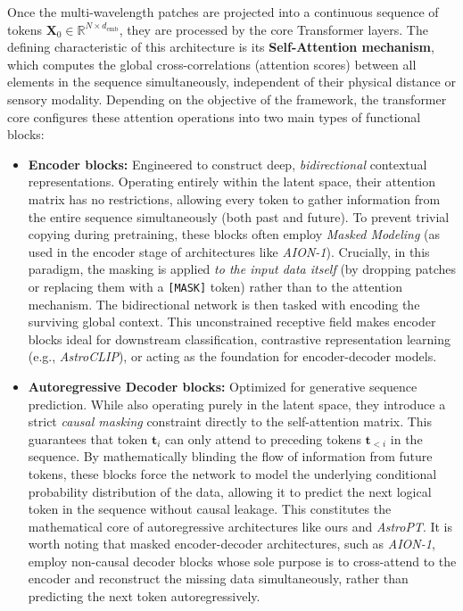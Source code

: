 Once the multi-wavelength patches are projected into a continuous sequence of tokens $\mathbf{X}_0 \in \mathbb{R}^{N \times d_{\text{emb}}}$, they are processed by the core Transformer layers. The defining characteristic of this architecture is its \textbf{Self-Attention mechanism}, which computes the global cross-correlations (attention scores) between all elements in the sequence simultaneously, independent of their physical distance or sensory modality. Depending on the objective of the framework, the transformer core configures these attention operations into two main types of functional blocks:
\begin{itemize}
	\item \textbf{Encoder blocks:} Engineered to construct deep, \textit{bidirectional} contextual representations. Operating entirely within the latent space, their attention matrix has no restrictions, allowing every token to gather information from the entire sequence simultaneously (both past and future). To prevent trivial copying during pretraining, these blocks often employ \textit{Masked Modeling} (as used in the encoder stage of architectures like \textit{AION-1}). Crucially, in this paradigm, the masking is applied \textit{to the input data itself} (by dropping patches or replacing them with a \texttt{[MASK]} token) rather than to the attention mechanism. The bidirectional network is then tasked with encoding the surviving global context. This unconstrained receptive field makes encoder blocks ideal for downstream classification, contrastive representation learning (e.g., \textit{AstroCLIP}), or acting as the foundation for encoder-decoder models.
	\item \textbf{Autoregressive Decoder blocks:} Optimized for generative sequence prediction. While also operating purely in the latent space, they introduce a strict \textit{causal masking} constraint directly to the self-attention matrix. This guarantees that token $\mathbf{t}_i$ can only attend to preceding tokens $\mathbf{t}_{<i}$ in the sequence. By mathematically blinding the flow of information from future tokens, these blocks force the network to model the underlying conditional probability distribution of the data, allowing it to predict the next logical token in the sequence without causal leakage. This constitutes the mathematical core of autoregressive architectures like ours and \textit{AstroPT}. It is worth noting that masked encoder-decoder architectures, such as \textit{AION-1}, employ non-causal decoder blocks whose sole purpose is to cross-attend to the encoder and reconstruct the missing data simultaneously, rather than predicting the next token autoregressively.
\end{itemize}

